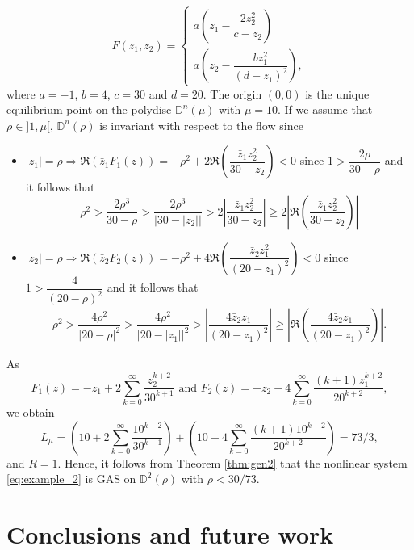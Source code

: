\documentclass{article}
\begin{document}
\begin{equation}\label{eq:example_2}
F(z_1,z_2)=\begin{cases} a \left(z_1-\dfrac{2z_2^2}{c-z_2}\right)\\
a \left(z_2-\dfrac{bz_1^2}{(d-z_1)^2}\right),\end{cases}
\end{equation}
where  $a=-1$, $b=4$, $c=30$ and $d=20$. The origin $(0,0)$ is the unique equilibrium point on the polydisc  $\mathbb{D}^n\left(\mu\right)$ with $\mu=10$. If we assume that  $\rho\in ]1,\mu[$, $\mathbb{D}^n\left(\rho\right)$ is invariant with respect to the flow since
 \begin{itemize}
 \item {\small $|z_1|=\rho \Rightarrow \Re\left( \bar z_1 F_1(z) \right)=-\rho^2+2\Re\left(  \dfrac{\bar z_1z_2^2}{30-z_2} \right)<0$}
 since {\small \mbox{$1> \dfrac{2\rho}{30-\rho}$}} and it follows that
{\small \[ \rho^2>\dfrac{2\rho^3}{30-\rho}>\dfrac{2\rho^3}{\left|30-|z_2|\right|}>2\left|  \dfrac{\bar z_1z_2^2}{30-z_2} \right|\geq 2\left| \Re\left(  \dfrac{\bar z_1z_2^2}{30-z_2}\right)\right| \]}
 \item {\small $|z_2|=\rho \Rightarrow \Re\left( \bar z_2 F_2(z) \right)=-\rho^2+4\Re\left( \dfrac{ \bar z_2 z_1^2}{(20-z_1)^2} \right)<0$}
  since {\small $1> \dfrac{4}{(20-\rho)^2}$} and it follows that
 {\small\begin{multline*}
      \rho^2>\dfrac{4\rho^2}{|20-\rho|^2}>\dfrac{4\rho^2}{\left|20-|z_1|\right|^2}>\left|  \dfrac{4\bar z_2z_1}{(20-z_1)^2} \right| \geq \left| \Re\left(  \dfrac{4\bar z_2z_1}{(20-z_1)^2}\right)\right| .\end{multline*}}
 \end{itemize}
As {\small\[ F_1(z)=-z_1+2\sum_{k=0}^\infty \dfrac{z_2^{k+2}}{30^{k+1}}  \text{ and }  F_2(z)=-z_2+4\sum_{k=0}^\infty \dfrac{(k+1)z_1^{k+2}}{20^{k+2}},\] }
we  obtain 
{\small\[
L_\mu=\left( 10+2 \sum_{k=0}^\infty \dfrac{10^{k+2}}{30^{k+1}} \right)+\left( 10+4 \sum_{k=0}^\infty \dfrac{(k+1)10^{k+2}}{20^{k+2}} \right)=73/3,
\]}
and  $R=1$. 
Hence, it follows from Theorem \ref{thm:gen2} that the nonlinear system \eqref{eq:example_2} is GAS on $\mathbb{D}^2(\rho)$ with $\rho<30/73$.


\section{Conclusions and future work}
\label{sec:concl}
\end{document}
